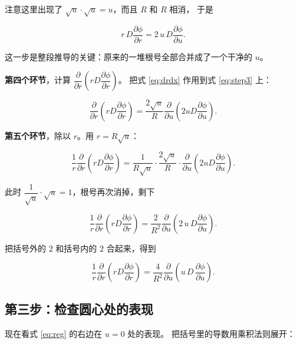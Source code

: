 注意这里出现了 $\sqrt{u}\cdot\sqrt{u}=u$，而且 $R$ 和 $R$ 相消，
于是

\begin{equation}
r\,D\frac{\partial\phi}{\partial r}
= 2\,u\,D\frac{\partial\phi}{\partial u}.
\label{eq:step3}
\end{equation}

这一步是整段推导的关键：原来的一堆根号全部合并成了一个干净的 $u$。

\textbf{第四个环节}，计算 $\dfrac{\partial}{\partial r}\left(rD\dfrac{\partial\phi}{\partial r}\right)$。
把式 \eqref{eq:drdx} 作用到式 \eqref{eq:step3} 上：

\begin{equation}
\frac{\partial}{\partial r}\left(rD\frac{\partial\phi}{\partial r}\right)
= \frac{2\sqrt{u}}{R}\frac{\partial}{\partial u}\left(2uD\frac{\partial\phi}{\partial u}\right).
\end{equation}

\textbf{第五个环节}，除以 $r$。用 $r=R\sqrt{u}$：

\begin{equation}
\frac{1}{r}\frac{\partial}{\partial r}\left(rD\frac{\partial\phi}{\partial r}\right)
= \frac{1}{R\sqrt{u}}\cdot\frac{2\sqrt{u}}{R}\cdot
\frac{\partial}{\partial u}\left(2uD\frac{\partial\phi}{\partial u}\right).
\end{equation}

此时 $\dfrac{1}{\sqrt{u}}\cdot\sqrt{u}=1$，根号再次消掉，剩下

\begin{equation}
\frac{1}{r}\frac{\partial}{\partial r}\left(rD\frac{\partial\phi}{\partial r}\right)
= \frac{2}{R^2}\frac{\partial}{\partial u}\left(2\,u\,D\frac{\partial\phi}{\partial u}\right).
\end{equation}

把括号外的 $2$ 和括号内的 $2$ 合起来，得到

\begin{equation}
\boxed{\;
\frac{1}{r}\frac{\partial}{\partial r}\left(rD\frac{\partial\phi}{\partial r}\right)
= \frac{4}{R^2}\frac{\partial}{\partial u}\left(u\,D\,\frac{\partial\phi}{\partial u}\right).
\;}
\label{eq:reg}
\end{equation}

\subsection{第三步：检查圆心处的表现}

现在看式 \eqref{eq:reg} 的右边在 $u=0$ 处的表现。
把括号里的导数用乘积法则展开：

